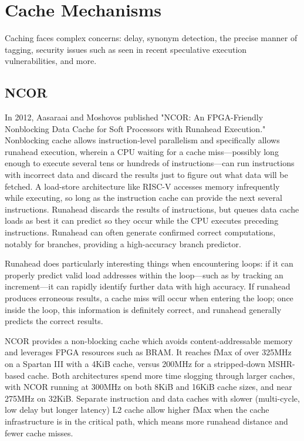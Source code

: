 \chapter{Cache Mechanisms}

Caching faces complex concerns:  delay, synonym detection, the precise manner of tagging, security issues such as seen in recent speculative execution vulnerabilities, and more.

\section{NCOR}

In 2012, Aasaraai and Moshovos published "NCOR:  An FPGA-Friendly Nonblocking Data Cache for Soft Processors with Runahead Execution."  Nonblocking cache allows instruction-level parallelism and specifically allows runahead execution, wherein a CPU waiting for a cache miss—possibly long enough to execute several tens or hundreds of instructions—can run instructions with incorrect data and discard the results just to figure out what data will be fetched.  A load-store architecture like RISC-V accesses memory infrequently while executing, so long as the instruction cache can provide the next several instructions.  Runahead discards the results of instructions, but queues data cache loads as best it can predict so they occur while the CPU executes preceding instructions.  Runahead can often generate confirmed correct computations, notably for branches, providing a high-accuracy branch predictor.

Runahead does particularly interesting things when encountering loops:  if it can properly predict valid load addresses within the loop—such as by tracking an increment—it can rapidly identify further data with high accuracy.  If runahead produces erroneous results, a cache miss will occur when entering the loop; once inside the loop, this information is definitely correct, and runahead generally predicts the correct results.

NCOR provides a non-blocking cache which avoids content-addressable memory and leverages FPGA resources such as BRAM.  It reaches fMax of over 325MHz on a Spartan III with a 4KiB cache, versus 200MHz for a stripped-down MSHR-based cache.  Both architectures spend more time slogging through larger caches, with NCOR running at 300MHz on both 8KiB and 16KiB cache sizes, and near 275MHz on 32KiB.  Separate instruction and data caches with slower (multi-cycle, low delay but longer latency) L2 cache allow higher fMax when the cache infrastructure is in the critical path, which means more runahead distance and fewer cache misses.

